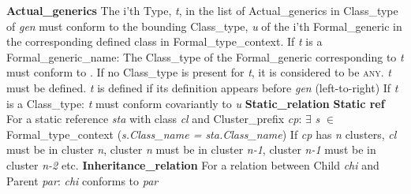 \indent \indent \indent \textbf{Actual\_generics}\newline
\indent \indent \indent \indent The i'th Type, \textit{t}, in the list of Actual\_generics in Class\_type of \textit{gen} must conform \newline
\indent \indent \indent \indent to the bounding Class\_type, \textit{u} of the i'th Formal\_generic in the corresponding\newline
\indent \indent \indent \indent  defined class in Formal\_type\_context.\newline\newline
\indent \indent \indent \indent If \textit{t} is a Formal\_generic\_name:\newline
\indent \indent \indent \indent \indent The Class\_type of the Formal\_generic corresponding to \textit{t} must conform to . If no \newline 
\indent \indent \indent \indent \indent Class\_type is present for \textit{t}, it is considered to be \textsc{any}.\newline
\indent \indent \indent \indent \textit{t} must be defined. \textit{t} is defined if its definition appears before \textit{gen} (left-to-right)\newline
\indent \indent \indent \indent If \textit{t} is a Class\_type:\newline
\indent \indent \indent \indent \textit{t} must conform covariantly to \textit{u}\newline
\textbf{Static\_relation}\newline
\indent \textbf{Static ref}\newline
\indent \indent For a static reference \textit{sta} with class \textit{cl} and Cluster\_prefix \textit{cp}:\newline
\indent \indent \indent $\exists$ \textit{s} $\in$ Formal\_type\_context (\textit{s.Class\_name = sta.Class\_name})\newline
\indent \indent \indent If \textit{cp} has \textit{n} clusters, \textit{cl} must be in cluster \textit{n}, cluster \textit{n} must be in cluster \textit{n-1}, cluster \textit{n-1} \newline
\indent\indent\indent must be in cluster \textit{n-2} etc.\newline
\indent \textbf{Inheritance\_relation}\newline
\indent \indent \indent For a relation between Child \textit{chi} and Parent \textit{par}:\newline
\indent \indent \indent \textit{chi} conforms to \textit{par}\newline
